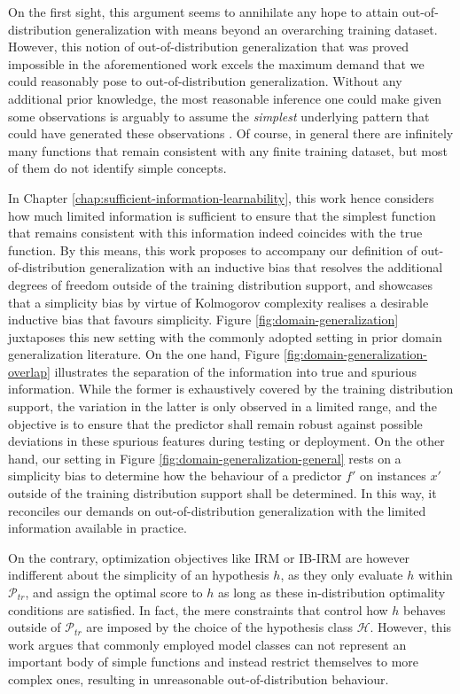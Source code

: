 On the first sight, this argument seems to annihilate any hope to attain out-of-distribution generalization with means beyond an overarching training dataset.
However, this notion of out-of-distribution generalization that was proved impossible in the aforementioned work excels the maximum demand that we could reasonably pose to out-of-distribution generalization.
Without any additional prior knowledge, the most reasonable inference one could make given some observations is arguably to assume the \textit{simplest} underlying pattern that could have generated these observations \cite{solomonoff1964formal}.
Of course, in general there are infinitely many functions that remain consistent with any finite training dataset, but most of them do not identify simple concepts.

In Chapter \ref{chap:sufficient-information-learnability}, this work hence considers how much limited information is sufficient to ensure that the simplest function that remains consistent with this information indeed coincides with the true function. 
By this means, this work proposes to accompany our definition of out-of-distribution generalization with an inductive bias that resolves the additional degrees of freedom outside of the training distribution support, and showcases that a simplicity bias by virtue of Kolmogorov complexity realises a desirable inductive bias that favours simplicity.
Figure \ref{fig:domain-generalization} juxtaposes this new setting with the commonly adopted setting in prior domain generalization literature. 
On the one hand, Figure \ref{fig:domain-generalization-overlap} illustrates the separation of the information into true and spurious information. 
While the former is exhaustively covered by the training distribution support, the variation in the latter is only observed in a limited range, and the objective is to ensure that the predictor shall remain robust against possible deviations in these spurious features during testing or deployment.
On the other hand, our setting in Figure \ref{fig:domain-generalization-general} rests on a simplicity bias to determine how the behaviour of a predictor $f'$ on instances $x'$ outside of the training distribution support shall be determined.
In this way, it reconciles our demands on out-of-distribution generalization with the limited information available in practice.

On the contrary, optimization objectives like IRM or IB-IRM are however indifferent about the simplicity of an hypothesis $h$, as they only evaluate $h$ within $\mathcal{P}_{tr}$, and assign the optimal score to $h$ as long as these in-distribution optimality conditions are satisfied.
In fact, the mere constraints that control how $h$ behaves outside of $\mathcal{P}_{tr}$ are imposed by the choice of the hypothesis class $\mathcal{H}$.
However, this work argues that commonly employed model classes can not represent an important body of simple functions and instead restrict themselves to more complex ones, resulting in unreasonable out-of-distribution behaviour.

